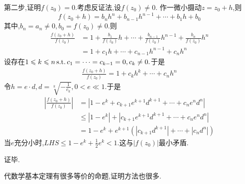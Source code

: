 \begin{formal}
\begin{Proof}
    第二步,证明$f\left(z_0\right)=0.$考虑反证法,设$f\left(z_0\right)\neq 0.$
    作一微小摄动$z=z_0+h$,则
    \[
    f\left(z_0+h\right)=b_nh^n+b_{n-1}h^{n-1}+\cdots+b_1h+b_0
    \]
    其中,$b_n=a_n\neq 0,b_0=f\left(z_0\right)\neq 0.$则
    \begin{align*}
         \frac{f\left(z_0+h\right)}{f\left(z_0\right)}&=1+\frac{b_1}{f\left(z_0\right)}h+
    \cdots+\frac{b_{n-1}}{f\left(z_0\right)}h^{n-1}+\frac{b_n}{f\left(z_0\right)}h^n\\
    &=1+c_1h+\cdots+c_{n-1}h^{n-1}+c_nh^n
    \end{align*}
    设存在$1\leqslant k\leqslant n\,\textup{s.t.}\,c_1=\cdots=c_{k-1}=0,c_k\neq 0.
    $于是
    \begin{align*}
        \frac{f\left(z_0+h\right)}{f\left(z_0\right)}=1+c_kh^k+\cdots+c_nh^n
    \end{align*}
    令$\displaystyle
    h=e\cdot d,d=\sqrt[k]{-\frac{1}{c_k}},0<e\ll 1.$于是
    \begin{align*}
     \left|    
        \frac{f\left(z_0+h\right)}{f\left(z_0\right)}\right|&=
    \left|1-e^k+c_{k+1}e^{k+1}d^{k+1}+\cdots+c_ne^nd^n
    \right|
    \\
    &\leqslant 
    \left|1-e^k\right|+\left|c_{k+1}e^{k+1}d^{k+1}+\cdots+c_ne^nd^n
    \right|\\
    &=1-e^k+e^{k+1}\left(\left|c_{k+1}d^{k+1}\right|+\cdots+\left|c_nd^n\right|\right)
    \end{align*}
    当$e$充分小时,$\displaystyle
    LHS\leqslant 1-e^k+\frac{1}{2}e^k<1$.这与$\left|f\left(z_0\right)\right|$最小矛盾.

    证毕.
   \end{Proof}
\end{formal}
\begin{red}
\begin{remark}
    代数学基本定理有很多等价的命题,证明方法也很多.
\end{remark}
\end{red}
